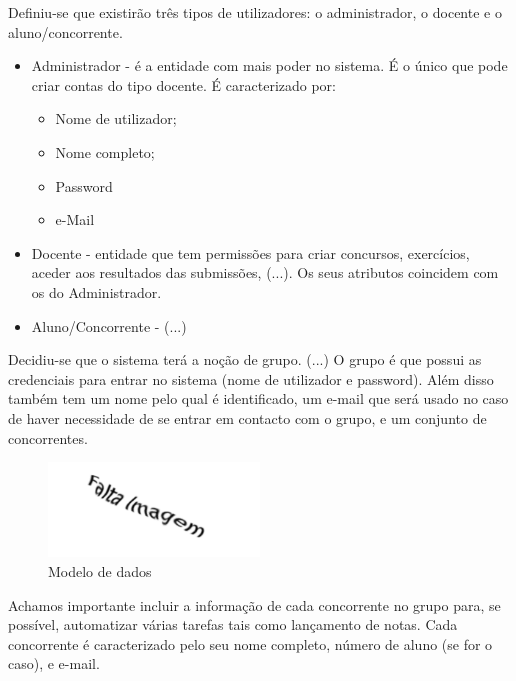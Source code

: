 Definiu-se que existirão três tipos de utilizadores: o administrador, o docente e o aluno/concorrente.\\

\begin{itemize}
  \item Administrador - é a entidade com mais poder no sistema. É o único que pode criar contas do tipo docente. É caracterizado por:
    \begin{itemize}
      \item Nome de utilizador;
      \item Nome completo;
      \item Password
      \item e-Mail
    \end{itemize}
  \item Docente - entidade que tem permissões para criar concursos, exercícios, aceder aos resultados das submissões, (...). Os seus atributos coincidem com os do Administrador.
  \item Aluno/Concorrente - (...)
\end{itemize}

Decidiu-se que o sistema terá a noção de grupo. 
(...)
O grupo é que possui as credenciais para entrar no sistema (nome de utilizador e password). 
Além disso também tem um nome pelo qual é identificado, um e-mail que será usado no caso de haver necessidade de se entrar em contacto com o grupo, e um conjunto de concorrentes.\\

\begin{figure}[htbp]
\begin{center}
\includegraphics[width=0.5\textwidth]{Images/missimage}
\caption{Modelo de dados}\label{fig modedados}
\end{center}
\end{figure}

Achamos importante incluir a informação de cada concorrente no grupo para, se possível, automatizar várias tarefas tais como lançamento de notas.
Cada concorrente é caracterizado pelo seu nome completo, número de aluno (se for o caso), e e-mail.\\

